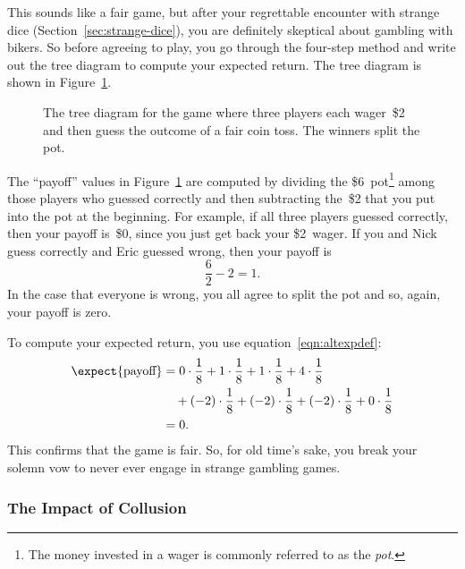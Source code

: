 This sounds like a fair game, but after your regrettable encounter
with strange dice (Section~\ref{sec:strange-dice}), you are definitely
skeptical about gambling with bikers.  So before agreeing to play, you
go through the four-step method and write out the tree diagram to
compute your expected return.  The tree diagram is shown in
Figure~\ref{fig:17E1}.

\begin{figure}


\caption{The tree diagram for the game where three players each
  wager~\$2 and then guess the outcome of a fair coin toss.  The
  winners split the pot.}

\label{fig:17E1}

\end{figure}

The ``payoff'' values in Figure~\ref{fig:17E1} are computed by
dividing the \$6~pot\footnote{The money invested in a wager is
  commonly referred to as the \emph{pot}.} among those players who
guessed correctly and then subtracting the~\$2 that you put into the
pot at the beginning.  For example, if all three players guessed
correctly, then your payoff is~\$0, since you just get back your
\$2~wager.  If you and Nick guess correctly and Eric guessed wrong,
then your payoff is
\begin{equation*}
    \frac{6}{2} - 2 = 1.
\end{equation*}
In the case that everyone is wrong, you all agree to split the pot
and so, again, your payoff is zero.

To compute your expected return, you use
equation~\eqref{eqn:altexpdef}:
\begin{align*}
\expect{\text{payoff}}
    &= 0 \cdot \frac{1}{8} + 1 \cdot \frac{1}{8} + 1 \cdot \frac{1}{8}
        + 4 \cdot \frac{1}{8} \\
        & \quad {}+ (-2) \cdot \frac{1}{8} + (-2) \cdot \frac{1}{8}
        + (-2) \cdot \frac{1}{8}
        + 0 \cdot \frac{1}{8} \\
    &= 0.
\end{align*}
This confirms that the game is fair.  So, for old time's sake, you
break your solemn vow to never ever engage in strange gambling games.

\subsubsection{The Impact of Collusion}

